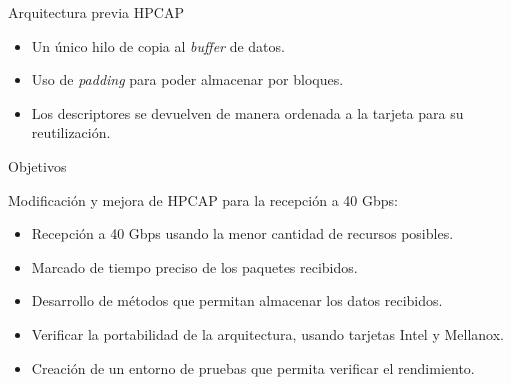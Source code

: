 \documentclass[10pt,notes,compress,usetitleprogressbar,aspectratio=1610]{beamer}
\begin{document}
\begin{frame}{Arquitectura previa HPCAP}


\begin{figure}[hbtp]
\centering

\end{figure}

\begin{itemize}
\item Un único hilo de copia al \textit{buffer} de datos.
\item Uso de \textit{padding} para poder almacenar por bloques. 
\item Los descriptores se devuelven de manera ordenada a la tarjeta para su reutilización.
\end{itemize}

\end{frame}


\begin{frame}{Objetivos}

Modificación y mejora de HPCAP para la recepción a 40 Gbps:

\begin{itemize}
\item Recepción a 40 Gbps usando la menor cantidad de recursos posibles.
\item Marcado de tiempo preciso de los paquetes recibidos.
\item Desarrollo de métodos que permitan almacenar los datos recibidos.
\item Verificar la portabilidad de la arquitectura, usando tarjetas Intel y Mellanox.
\item Creación de un entorno de pruebas que permita verificar el rendimiento.
\end{itemize}

\end{frame}
\end{document}
